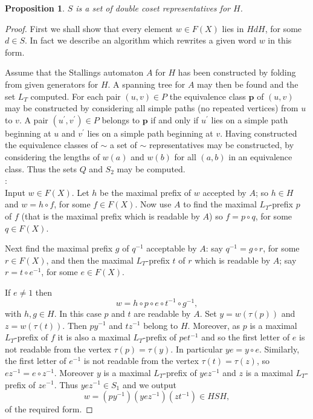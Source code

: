\documentclass[a4paper,12pt]{article}
\renewcommand{\t}{\tau }
\newcommand{\pp}{\mathbf{p}}
\newtheorem{proposition}[theorem]{Proposition}
\numberwithin{equation}{section}
\numberwithin{figure}{section}
\begin{document}
\begin{proposition}\label{prop:dcreps}
$S$ is a set of double coset representatives for $H$.
\end{proposition}   
\begin{proof}
First we shall show that every element $w\in F(X)$ lies in $HdH$, for some $d\in S$. 
In fact we describe an algorithm which rewrites a given word $w$ in this form. 

Assume that the Stallings automaton $A$ for $H$ has been constructed by folding from
given generators for $H$. A spanning tree for $A$ may then be found and the 
set $L_T$ computed. For each pair $(u,v)\in P$ the equivalence class $\pp$ of 
$(u,v)$ may be constructed by considering all simple paths (no repeated vertices)
from $u$ to $v$. A pair $(u^\prime ,v^\prime) \in P$ belongs to $\pp$ if and only
if $u^\prime$ lies on a simple path beginning at $u$ and $v^\prime$ lies on 
a simple path beginning at $v$. Having constructed the equivalence classes of $\sim$
 a set of $\sim$ representatives may be constructed, by considering the 
lengths of $w(a)$ and $w(b)$ for all $(a,b)$ in an equivalence class. Thus the
sets $Q$ and $S_2$ may be computed.   \\

:\\
Input $w\in F(X)$. 
Let $h$ be the maximal prefix of $w$ accepted by $A$; so $h\in H$ and 
$w=h\circ f$, for some $f\in F(X)$. Now use $A$ to find the maximal $L_T$-prefix $p$ 
of $f$ (that is the maximal prefix which is readable by $A$)
 so $f= p\circ q$, for some $q\in F(X)$. 

Next find the maximal prefix $g$ of $q^{-1}$ acceptable by $A$: say 
$q^{-1}=g\circ r$, for some $r\in F(X)$, and then the maximal $L_T$-prefix 
$t$ of $r$ which
is readable by $A$; say $r=t\circ e^{-1}$, for some $e\in F(X)$. 

If $e\neq 1$ then
\[w=h\circ p \circ e\circ t^{-1}\circ g^{-1},\]
with $h,g\in H$. In this case $p$ and $t$ are readable by $A$. Set $y=w(\t(p))$
and $z=w(\t(t))$. Then $py^{-1}$ and $tz^{-1}$ belong to $H$. Moreover, as $p$
is a maximal $L_T$-prefix of $f$ it is also a maximal $L_T$-prefix of $pet^{-1}$ and so
  the 
first letter of $e$ is not readable from the vertex $\t(p)=\t(y)$. In particular
$ye=y\circ e$. Similarly, the first letter of $e^{-1}$ is not readable from
the vertex $\t(t)=\t(z)$, so $ez^{-1}=e\circ z^{-1}$. Moreover $y$ is a 
maximal $L_T$-prefix of $yez^{-1}$ and $z$ is a maximal $L_T$-prefix of $ze^{-1}$. 
Thus $yez^{-1}\in S_1$ and we output
\[w=(py^{-1}) (yez^{-1})(zt^{-1})\in HSH,\]
of the required form.


\end{proof}
\end{document}
